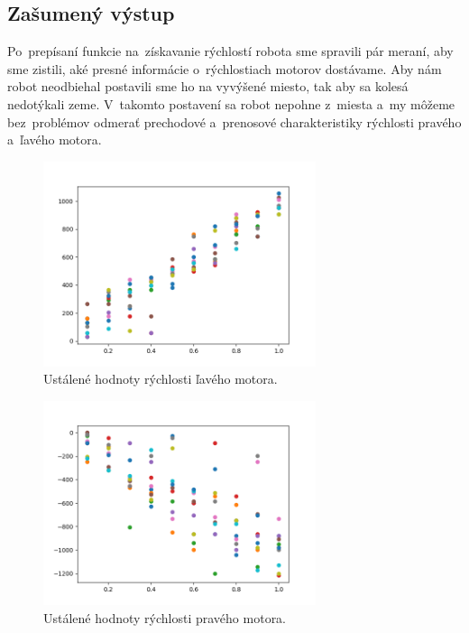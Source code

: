 \subsection{Zašumený výstup}

Po~prepísaní funkcie na~získavanie rýchlostí robota sme spravili pár meraní, aby sme zistili, aké presné informácie o~rýchlostiach
motorov dostávame. Aby nám robot neodbiehal postavili sme ho na vyvýšené miesto, tak aby sa kolesá nedotýkali zeme. V~takomto
postavení sa robot nepohne z~miesta a~my môžeme bez~problémov odmerať prechodové a~prenosové charakteristiky rýchlosti pravého
a~ľavého motora.

\begin{figure}[!htbp]
	\begin{center}
		\includegraphics[width=8cm]{img/Left_wheel.png}
	\end{center}
	\caption{Ustálené hodnoty rýchlosti ľavého motora. }
	\label{fig:laveKoleso}
\end{figure}

\begin{figure}[!htbp]
	\begin{center}
		\includegraphics[width=8cm]{img/Right_wheel.png}
	\end{center}
	\caption{Ustálené hodnoty rýchlosti pravého motora. }
	\label{fig:praveKoleso}
\end{figure}

